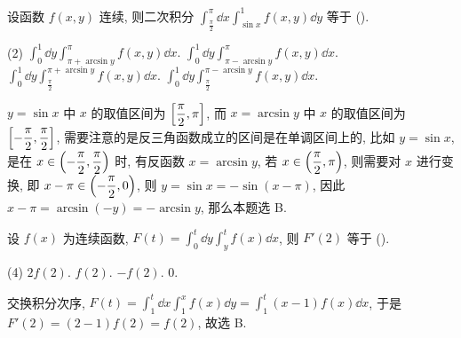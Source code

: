 \begin{example}
    设函数 $f(x,y)$ 连续, 则二次积分 $\displaystyle \int_{\frac{\pi}{2}}^{\pi}  \dd x\int_{\sin x}^{1} f(x,y) \dd y$ 等于 (\quad).
    \begin{tasks}(2)
        \task $\displaystyle \int_{0}^{1}\dd y\int_{\pi+\arcsin y}^{\pi} f(x,y)\dd x.$
        \task $\displaystyle \int_{0}^{1}\dd y\int_{\pi-\arcsin y}^{\pi} f(x,y)\dd x.$
        \task $\displaystyle \int_{0}^{1}\dd y\int_{\frac{\pi}{2}}^{\pi+\arcsin y} f(x,y)\dd x.$
        \task $\displaystyle \int_{0}^{1}\dd y\int_{\frac{\pi}{2}}^{\pi-\arcsin y} f(x,y)\dd x.$
    \end{tasks}
\end{example}
\begin{solution}
    $y=\sin x$ 中 $x$ 的取值区间为 $\qty[\dfrac{\pi}{2},\pi]$, 而 $x=\arcsin y$ 中 $x$ 的取值区间为 $\qty[-\dfrac{\pi}{2},\dfrac{\pi}{2}]$,
    需要注意的是反三角函数成立的区间是在单调区间上的, 比如 $y=\sin x$, 是在 $x\in\qty(-\dfrac{\pi}{2},\dfrac{\pi}{2})$ 时, 有反函数 $x=\arcsin y$, 若 $x\in\qty(\dfrac{\pi}{2},\pi)$,
    则需要对 $x$ 进行变换, 即 $x-\pi\in\qty(-\dfrac{\pi}{2},0)$, 则 $y=\sin x=-\sin(x-\pi)$, 因此 $x-\pi=\arcsin(-y)=-\arcsin y$,
    那么本题选 B.
\end{solution}

\begin{example}[2004 数一]
    设 $f(x)$ 为连续函数, $\displaystyle F(t)=\int_{0}^{t}\dd y\int_{y}^{t}f(x)\dd x$, 则 $F'(2)$ 等于 (\quad).
    \begin{tasks}(4)
        \task $2f(2).$
        \task $f(2).$
        \task $-f(2).$
        \task $0.$
    \end{tasks}
\end{example}
\begin{solution}
    交换积分次序, $\displaystyle F(t)=\int_{1}^{t}\dd x\int_{1}^{x}f(x)\dd y=\int_{1}^{t}(x-1)f(x)\dd x$,
    于是 $F'(2)=(2-1)f(2)=f(2)$, 故选 B.
\end{solution}

